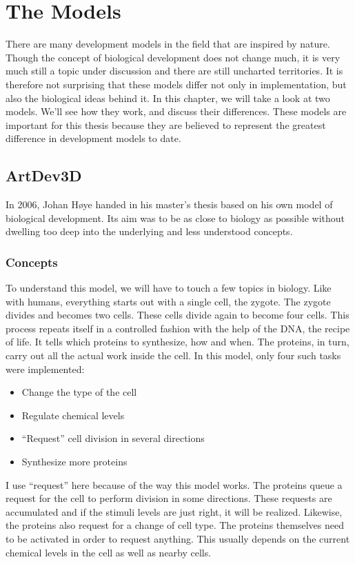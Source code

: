 \section{The Models}
There are many development models in the field that are inspired by nature. Though the concept of biological development does not change much, it is very much still a topic under discussion and there are still uncharted territories. It is therefore not surprising that these models differ not only in implementation, but also the biological ideas behind it. In this chapter, we will take a look at two models. We'll see how they work, and discuss their differences. These models are important for this thesis because they are believed to represent the greatest difference in development models to date.

\subsection{ArtDev3D}
\label{sec:Models:ArtDev3D}
In 2006, Johan H{\o}ye handed in his master's thesis\cite{hoye2006} based on his own model of biological development. Its aim was to be as close to biology as possible without dwelling too deep into the underlying and less understood concepts.

\subsubsection{Concepts}
To understand this model, we will have to touch a few topics in biology. Like with humans, everything starts out with a single cell, the zygote. The zygote divides and becomes two cells. These cells divide again to become four cells. This process repeats itself in a controlled fashion with the help of the DNA, the recipe of life. It tells which proteins to synthesize, how and when. The proteins, in turn, carry out all the actual work inside the cell. In this model, only four such tasks were implemented:

\begin{itemize}
	\itemsep=0pt
	\item Change the type of the cell
	\item Regulate chemical levels
	\item ``Request'' cell division in several directions
	\item Synthesize more proteins
\end{itemize}

I use ``request'' here because of the way this model works. The proteins queue a request for the cell to perform division in some directions. These requests are accumulated and if the stimuli levels are just right, it will be realized. Likewise, the proteins also request for a change of cell type. The proteins themselves need to be activated in order to request anything. This usually depends on the current chemical levels in the cell as well as nearby cells.

